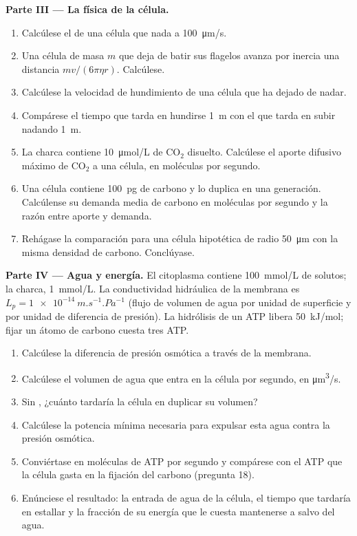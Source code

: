 \begin{problem}
\medskip
\noindent\textbf{Parte III --- La física de la célula.}
\begin{enumerate}[resume]
  \item Calcúlese el  de una célula que nada a
        \qty{100}{\micro m/s}.
  \item Una célula de masa $m$ que deja de batir sus flagelos avanza por
        inercia una distancia $mv/(6\pi\eta r)$. Calcúlese.
  \item Calcúlese la velocidad de hundimiento de una célula que ha dejado
        de nadar.
  \item Compárese el tiempo que tarda en hundirse \qty{1}{m} con el que
        tarda en subir nadando \qty{1}{m}.
  \item La charca contiene \qty{10}{\micro mol/L} de $\mathrm{CO_2}$
        disuelto. Calcúlese el aporte difusivo máximo de
        $\mathrm{CO_2}$ a una célula, en moléculas por segundo.
  \item Una célula contiene \qty{100}{pg} de carbono y lo duplica en una
        generación. Calcúlense su demanda media de carbono en moléculas
        por segundo y la razón entre aporte y demanda.
  \item Rehágase la comparación para una célula hipotética de radio
        \qty{50}{\micro m} con la misma densidad de carbono. Conclúyase.
\end{enumerate}

\medskip
\noindent\textbf{Parte IV --- Agua y energía.}
El citoplasma contiene \qty{100}{mmol/L} de solutos; la charca,
\qty{1}{mmol/L}. La conductividad hidráulica de la membrana es $L_p =
\qty{1e-14}{m.s^{-1}.Pa^{-1}}$ (flujo de volumen de agua por unidad de
superficie y por unidad de diferencia de presión). La hidrólisis de un
ATP libera \qty{50}{kJ/mol}; fijar un átomo de carbono cuesta tres ATP.
\begin{enumerate}[resume]
  \item Calcúlese la diferencia de presión osmótica a través de la membrana.
  \item Calcúlese el volumen de agua que entra en la célula por segundo, en
        \unit{\micro m^3/s}.
  \item Sin , ¿cuánto tardaría la célula en duplicar su
        volumen?
  \item Calcúlese la potencia mínima necesaria para expulsar esta agua
        contra la presión osmótica.
  \item Conviértase en moléculas de ATP por segundo y compárese con el ATP
        que la célula gasta en la fijación del carbono (pregunta 18).
  \item Enúnciese el resultado: la entrada de agua de la célula, el tiempo
        que tardaría en estallar y la fracción de su energía que le cuesta
        mantenerse a salvo del agua.
\end{enumerate}
\end{problem}
